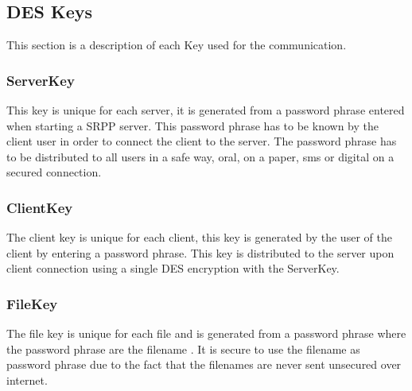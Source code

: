 \subsection{DES Keys}
This section is a description of each Key used for the communication. 

\subsubsection{ServerKey}
This key is unique for each server, it is generated from a password phrase entered when starting a SRPP server. This password phrase has to be known by the client user in order to connect the client to the server. The password phrase has to be distributed to all users in a safe way, oral, on a paper, sms or digital on a secured connection. 

\subsubsection{ClientKey}
The client key is unique for each client, this key is generated by the user of the client by entering a password phrase. This key is distributed to the server upon client connection using a single DES encryption with the ServerKey. 

\subsubsection{FileKey}
The file key is unique for each file and is generated from a password phrase  where the password phrase are the filename . It is secure to use the filename as password phrase due to the fact that the filenames are never sent unsecured over internet. 
